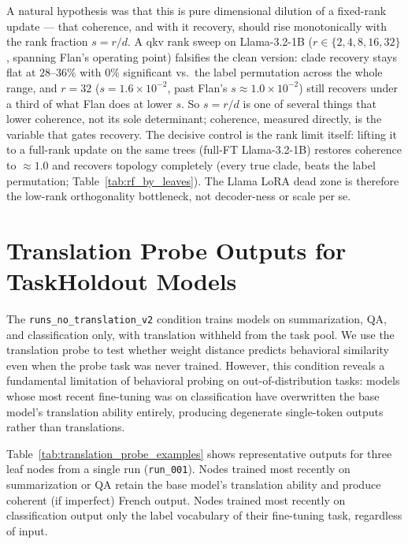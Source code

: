 \documentclass{article}
\theoremstyle{definition}
\theoremstyle{plain}
\begin{document}
A natural hypothesis was that this is pure dimensional dilution of a fixed-rank update --- that
coherence, and with it recovery, should rise monotonically with the rank fraction $s=r/d$. A
qkv rank sweep on Llama-3.2-1B ($r\in\{2,4,8,16,32\}$, spanning Flan's operating point) falsifies the
clean version: clade recovery stays flat at $28$--$36\%$ with $0\%$ significant vs.\ the label
permutation across the whole range, and $r{=}32$ ($s=1.6\!\times\!10^{-2}$, past Flan's
$s\approx1.0\!\times\!10^{-2}$) still recovers under a third of what Flan does at lower $s$. So $s=r/d$
is one of several things that lower coherence, not its sole determinant; coherence, measured directly,
is the variable that gates recovery. The decisive control is the rank limit itself: lifting it to a
full-rank update on the same trees (full-FT Llama-3.2-1B) restores coherence to $\approx1.0$ and
recovers topology completely (every true clade, beats the label permutation;
Table~\ref{tab:rf_by_leaves}). The Llama LoRA dead zone is therefore the low-rank orthogonality
bottleneck, not decoder-ness or scale per se.


\fi

\section{Translation Probe Outputs for TaskHoldout Models}
\label{app:translation_probe}

The \texttt{runs\_no\_translation\_v2} condition trains models on summarization,
QA, and classification only, with translation withheld from the task pool. We use
the translation probe to test whether weight distance predicts behavioral similarity
even when the probe task was never trained. However, this condition reveals a
fundamental limitation of behavioral probing on out-of-distribution tasks: models
whose most recent fine-tuning was on classification have overwritten the base
model's translation ability entirely, producing degenerate single-token outputs
rather than translations.

Table~\ref{tab:translation_probe_examples} shows representative outputs for three
leaf nodes from a single run (\texttt{run\_001}). Nodes trained most recently on
summarization or QA retain the base model's translation ability and produce
coherent (if imperfect) French output. Nodes trained most recently on
classification output only the label vocabulary of their fine-tuning task,
regardless of input.
\end{document}
